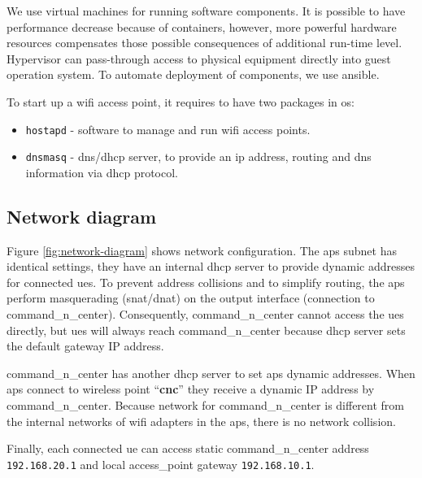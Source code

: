 We use virtual machines for running software components. It is possible to 
have performance decrease because of containers, however, more powerful
hardware resources compensates those possible consequences of additional 
run-time level. Hypervisor can pass-through access to physical equipment directly into guest operation system. To automate deployment of components, we use \gls{ansible}.

To start up a \gls{wifi} access point, it requires to have two packages in \acrshort{os}:

\begin{itemize}
\tightlist
\item
  \texttt{hostapd} - software to manage and run \gls{wifi} access points.
\item
  \texttt{dnsmasq} - \acrshort{dns}/\acrshort{dhcp} server, to provide an \acrshort{ip} address, routing
  and \acrshort{dns} information via \acrshort{dhcp} protocol.
\end{itemize}

\subsection{Network diagram}\label{network-diagram}


Figure \ref{fig:network-diagram} shows network configuration. The \glspl{ap} subnet has identical settings, they have an internal \gls{dhcp} server to provide dynamic addresses for connected \glspl{ue}. To prevent address collisions and to simplify routing, the \glspl{ap} perform masquerading (\acrshort{snat}/\acrshort{dnat}) on the output interface (connection to \gls{command_n_center}). Consequently, \gls{command_n_center} cannot access the \glspl{ue} directly, but \glspl{ue} will always reach \gls{command_n_center} because \acrshort{dhcp} server sets the default gateway IP address.

\gls{command_n_center} has another \acrshort{dhcp} server to set \glspl{ap} dynamic addresses. When \glspl{ap} connect to wireless point
``\textbf{cnc}'' they receive a dynamic IP address by \gls{command_n_center}.  Because network for \gls{command_n_center} is different from the internal networks of \gls{wifi} adapters in the \glspl{ap}, there is no network collision.

Finally, each connected \gls{ue} can access static \gls{command_n_center} address \texttt{192.168.20.1}
and local \acrshort{access_point} gateway \texttt{192.168.10.1}.


